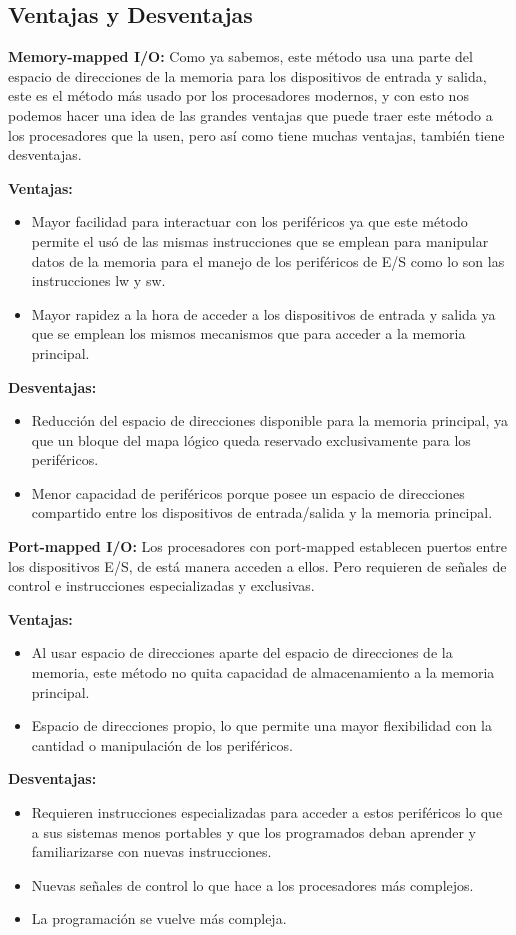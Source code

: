 \documentclass[12pt, a4paper]{article}
\begin{document}
\subsection{Ventajas y Desventajas}
\textbf{Memory-mapped I/O: }
Como ya sabemos, este método usa una parte del espacio de direcciones de la memoria para los dispositivos de entrada y salida, este es el método más usado por los procesadores modernos, y con esto nos podemos hacer una idea de las grandes ventajas que puede traer este método a los procesadores que la usen, pero así como tiene muchas ventajas, también tiene desventajas.

\textbf{Ventajas:}
\begin{itemize}
    \item Mayor facilidad para interactuar con los periféricos ya que este método permite el usó de las mismas instrucciones que se emplean para manipular datos de la memoria para el manejo de los periféricos de E/S como lo son las instrucciones lw y sw.
    \item Mayor rapidez a la hora de acceder a los dispositivos de entrada y salida ya que se emplean los mismos mecanismos que para acceder a la memoria principal.
\end{itemize}
\textbf{Desventajas:}
\begin{itemize}
    \item Reducción del espacio de direcciones disponible para la memoria principal, ya que un bloque del mapa lógico queda reservado exclusivamente para los periféricos.
    \item Menor capacidad de periféricos porque posee un espacio de direcciones compartido entre los dispositivos de entrada/salida y la memoria principal.
\end{itemize}
\textbf{Port-mapped I/O: }
Los procesadores con port-mapped establecen puertos entre los dispositivos E/S, de está manera acceden a ellos. Pero requieren de señales de control e instrucciones especializadas y exclusivas.

\textbf{Ventajas:}
\begin{itemize}
    \item Al usar espacio de direcciones aparte del espacio de direcciones de la memoria, este método no quita capacidad de almacenamiento a la memoria principal.
    \item Espacio de direcciones propio, lo que permite una mayor flexibilidad con la cantidad o manipulación de los periféricos.
\end{itemize}
\textbf{Desventajas:}
\begin{itemize}
    \item Requieren instrucciones especializadas para acceder a estos periféricos lo que a sus sistemas menos portables y que los programados deban aprender y familiarizarse con nuevas instrucciones.
    \item Nuevas señales de control lo que hace a los procesadores más complejos.
    \item La programación se vuelve más compleja.
\end{itemize}
\end{document}
